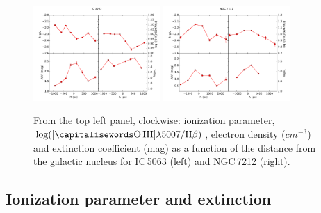 \documentclass[../main.tex]{subfiles}
\begin{document}
\begin{figure}
\centering
\includegraphics[width=0.43\textwidth]{images/paper1/IC5063_all.pdf} \quad
\includegraphics[width=0.43\textwidth]{images/paper1/NGC7212_all.pdf}\\
\caption[]{From the top left panel, clockwise: ionization parameter, $\log([\rm\ion{O}{III}]\lambda5007/\Hb)$, electron density ($\si{cm^{-3}}$) and extinction coefficient (mag) as a function of the distance from the galactic nucleus for IC\,5063 (left) and NGC\,7212 (right).}
\label{fig:all_N}
\end{figure}

\subsection{Ionization parameter and extinction}
\label{sec:ion_par}
\end{document}
